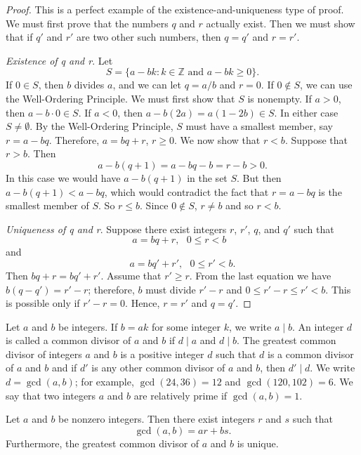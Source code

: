 \begin{proof}
This is a perfect example of the existence-and-uniqueness type of proof.  We must first prove that the numbers $q$ and $r$ actually  exist. Then we must show that if  $q'$ and $r'$ are two other such numbers, then $q = q'$ and $r = r'$. 
 
{\em Existence of q and r}.
Let
$$
S = \{ a - bk : k \in {\mathbb Z} \mbox{ and } a - bk \geq 0 \}.
$$
If $0 \in S$, then $b$ divides $a$, and  we can let $q = a/b$ and $r = 0$.  If $0 \notin S$, we can use the Well-Ordering Principle.  We must first show that $S$ is nonempty.  If $a > 0$, then $a - b \cdot 0 \in S$. If $a < 0$, then $a - b(2a) = a(1 - 2b) \in S$.  In either case $S \neq \emptyset$.  By the Well-Ordering Principle, $S$ must have a smallest member, say $r = a - bq$. Therefore, $a = bq + r$, $r \geq 0$. We now show that $r < b$. Suppose that $r > b$. Then   
$$
a - b(q + 1)= a - bq - b = r - b > 0.
$$
In this case we would have $a - b(q + 1)$ in the set $S$. But then $a - b(q + 1) < a - bq$, which would contradict the fact that $r = a - bq$ is the smallest member  of $S$. So $r \leq b$.  Since $0 \notin S$, $r \neq b$ and so $r < b$. 
 
{\em Uniqueness of q and r}.
Suppose there exist integers $r$, $r'$, $q$, and $q'$ such that
$$
a = bq + r, \mbox{ $0 \leq r < b$ }
$$
and
$$
a = bq' + r', \mbox{  $0 \leq r' < b$}.
$$
Then $ bq + r =  bq' + r'$.  Assume that $r' \geq r$.  From the last equation we have $b(q - q') = r' - r$; therefore, $b$ must divide $r' - r$ and $0 \leq r'- r \leq r' < b$.  This is possible only if $r' - r = 0$.  Hence, $r = r'$ and  $q = q'$. 
\end{proof}

\medskip

Let $a$ and $b$ be integers.  If $b = ak$ for some integer $k$, we write $a \mid b$\label{divides}.  An integer $d$ is called a {\bfi  common divisor\/} of $a$ and $b$ if $d \mid a$ and $d \mid b$.  The {\bfi greatest common divisor\/} of integers $a$ and $b$ is a positive integer $d$ such that $d$ is a common divisor  of $a$ and $b$ and if $d'$ is any other common divisor of $a$ and $b$, then $d' \mid d$.  We write $d = \gcd(a, b)$\label{greatestcd}; for example, $\gcd( 24, 36) = 12$ and $\gcd(120, 102) = 6$.  We say that two integers $a$ and $b$ are {\bfi relatively prime\/} if $\gcd( a, b ) = 1$. 

\begin{theorem}\label{integers_theorem_4}
Let $a$ and $b$ be nonzero integers. Then there exist integers $r$ and $s$ such that
$$
\gcd( a, b) = ar + bs.
$$
Furthermore, the greatest common divisor of $a$ and $b$ is unique.
\end{theorem}
 
